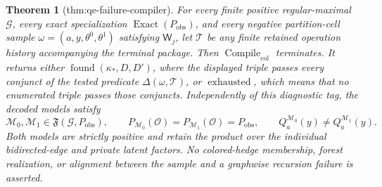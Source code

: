\documentclass{article}
\newtheorem{theorem}{Theorem}
\begin{document}
\begin{theorem}[thm:qe-failure-compiler]\label{thm:qe-failure-compiler}
For every finite positive regular-maximal \(\mathcal G\), every exact specialization \(\operatorname{Exact}(P_{\mathrm{obs}})\), and every negative partition-cell sample \(\omega=(a,y,\theta^0,\theta^1)\) satisfying \(\mathsf W_j\), let \(\mathcal T\) be any finite retained operation history accompanying the terminal package. Then \(\operatorname{Compile}_{\mathrm{col}}\) terminates. It returns either \(\operatorname{found}(\kappa_*,D,D')\), where the displayed triple passes every conjunct of the tested predicate \(\Delta(\omega,\mathcal T)\), or \(\operatorname{exhausted}\), which means that no enumerated triple passes those conjuncts. Independently of this diagnostic tag, the decoded models satisfy
\[
\mathcal M_0,\mathcal M_1\in\mathfrak F(\mathcal G,P_{\mathrm{obs}}),
\qquad
P_{\mathcal M_0}(\mathcal O)=P_{\mathcal M_1}(\mathcal O)=P_{\mathrm{obs}},
\qquad
Q_a^{\mathcal M_0}(y)\neq Q_a^{\mathcal M_1}(y).
\]
Both models are strictly positive and retain the product over the individual bidirected-edge and private latent factors. No colored-hedge membership, forest realization, or alignment between the sample and a graphwise recursion failure is asserted.
\end{theorem}
\end{document}
